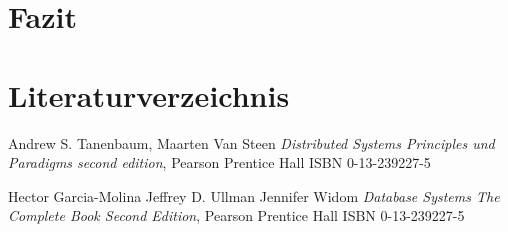 \documentclass[11pt]{scrartcl}       %
\begin{document}
\section{Fazit}\label{sec:kapitel5}

\newpage
\section{Literaturverzeichnis}
\begin{thebibliography}{99}                    %
	
	Andrew S. Tanenbaum, Maarten Van Steen 
	\emph{Distributed Systems Principles und Paradigms second edition},
	Pearson Prentice Hall ISBN 0-13-239227-5
	
Hector Garcia-Molina Jeffrey D. Ullman Jennifer Widom	
	\emph{Database Systems The Complete Book
	Second Edition},
	Pearson Prentice Hall ISBN 0-13-239227-5
\end{thebibliography}
\end{document}
